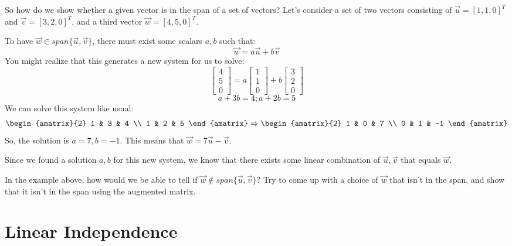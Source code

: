 \documentclass[11pt]{exam}
\begin{document}
    \vspace{20px}
    So how do we show whether a given vector is in the span of a set of vectors? Let's consider a set of two vectors consisting of
    $\vec{u} = [1,1,0]^T$ and $\vec{v} = [3,2,0]^T$, and a third vector $\vec{w} = [4,5,0]^T$.

    To have $\vec{w} \in span\{ \vec{u}, \vec{v} \}$, there must exist some scalars $a,b$ such that:
    $$\vec{w} = a \vec{u} + b \vec{v}$$
    You might realize that this generates a new system for us to solve:
    $$\begin{bmatrix} 4 \\ 5 \\ 0 \end{bmatrix} = a \begin{bmatrix} 1 \\ 1 \\ 0 \end{bmatrix} + b \begin{bmatrix} 3 \\ 2 \\ 0 \end{bmatrix}$$
    $$a + 3b = 4; a + 2b = 5$$
    We can solve this system like usual:
    $$\begin{amatrix}{2} 1 & 3 & 4 \\ 1 & 2 & 5 \end{amatrix} \Rightarrow \begin{amatrix}{2} 1 & 0 & 7 \\ 0 & 1 & -1 \end{amatrix}$$
    So, the solution is $a = 7, b = -1$. This means that $\vec{w} = 7\vec{u} - \vec{v}$.

    Since we found a solution $a,b$ for this new system, we know that there exists some linear combination of $\vec{u}, \vec{v}$ that equals $\vec{w}$.

    \vspace{20px}
    \begin{questions}
        \item In the example above, how would we be able to tell if $\vec{w} \notin span\{ \vec{u}, \vec{v} \}$? Try to come up with a choice of $\vec{w}$
        that isn't in the span, and show that it isn't in the span using the augmented matrix.
    \end{questions}

\pagebreak
\section{Linear Independence}
    
\end{document}
